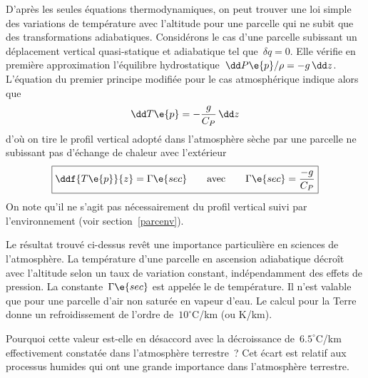 \sk
D'après les seules équations thermodynamiques, on peut trouver une loi simple des variations de température avec l'altitude pour une parcelle qui ne subit que des transformations adiabatiques. Considérons le cas d'une parcelle subissant un déplacement vertical quasi-statique et adiabatique tel que~$\delta q = 0$. Elle vérifie en première approximation l'équilibre hydrostatique~$\dd P\e{p} / \rho = - g \, \dd z$. L'équation du premier principe modifiée pour le cas atmosphérique indique alors que
\[  \dd T\e{p}  = - \frac{g}{C_P} \, \dd z \]
d'où on tire le profil vertical adopté dans l'atmosphère sèche par une parcelle ne subissant pas d'échange de chaleur avec l'extérieur
\[  \boxed{ \ddf{T\e{p}}{z}  = \Gamma\e{sec} \qquad \text{avec} \qquad \Gamma\e{sec} = \frac{-g}{C_P} } \]
On note qu'il ne s'agit pas nécessairement du profil vertical suivi par l'environnement (voir section~\ref{parcenv}).

\sk
Le résultat trouvé ci-dessus revêt une importance particulière en sciences de l'atmosphère. La température d'une parcelle en ascension adiabatique décroît avec l'altitude selon un taux de variation constant, indépendamment des effets de pression. La constante~$\Gamma\e{sec}$ est appelée le  de température. Il n'est valable que pour une parcelle d'air non saturée en vapeur d'eau. Le calcul pour la Terre donne un refroidissement de l'ordre de~$10^{\circ}$C/km (ou K/km). 

\sk
Pourquoi cette valeur est-elle en désaccord avec la décroissance de~$6.5^{\circ}$C/km effectivement constatée dans l'atmosphère terrestre~? Cet écart est relatif aux processus humides qui ont une grande importance dans l'atmosphère terrestre.



